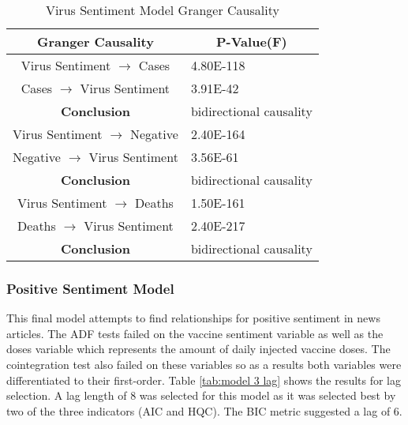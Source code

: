 \begin{table}[H]
\centering
\begin{tabular}{@{}cl@{}}
\toprule
\textbf{Granger Causality} & \multicolumn{1}{c}{\textbf{P-Value(F)}} \\ \midrule
Virus Sentiment $\rightarrow$ Cases & 4.80E-118 \\
Cases $\rightarrow$ Virus Sentiment & 3.91E-42 \\
\textbf{Conclusion} & \multicolumn{1}{r}{bidirectional causality} \\
Virus Sentiment $\rightarrow$ Negative & 2.40E-164 \\
Negative $\rightarrow$ Virus Sentiment & 3.56E-61 \\
\textbf{Conclusion} & \multicolumn{1}{r}{bidirectional causality} \\
Virus Sentiment $\rightarrow$ Deaths & 1.50E-161 \\
Deaths $\rightarrow$ Virus Sentiment & 2.40E-217 \\
\textbf{Conclusion} & \multicolumn{1}{r}{bidirectional causality} \\
\bottomrule
\end{tabular}
\caption{Virus Sentiment Model Granger Causality}
\label{tab:model 2 causality}
\end{table}

\subsubsection{Positive Sentiment Model}

This final model attempts to find relationships for positive sentiment in news articles. The ADF tests failed on the vaccine sentiment variable as well as the doses variable which represents the amount of daily injected vaccine doses. The cointegration test also failed on these variables so as a results both variables were differentiated to their first-order. Table \ref{tab:model 3 lag} shows the results for lag selection. A lag length of 8 was selected for this model as it was selected best by two of the three indicators (AIC and HQC). The BIC metric suggested a lag of 6.

